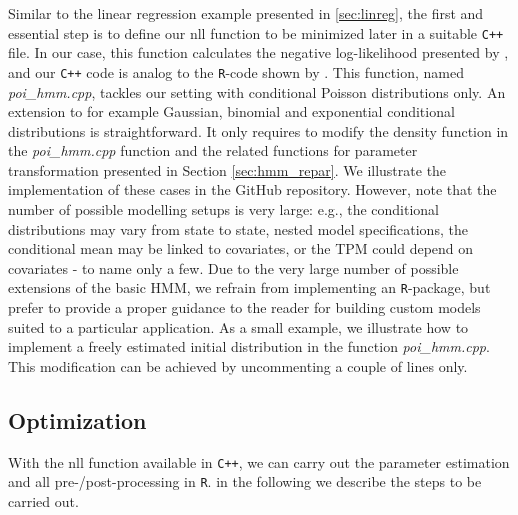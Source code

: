 \documentclass[bimj,fleqn]{w-art}\usepackage[]{graphicx}\usepackage[]{color}
\theoremstyle{plain}
\theoremstyle{definition}
\begin{document}
Similar to the linear regression example presented in \ref{sec:linreg}, the first and essential step is to define our nll function to be minimized later in a suitable {\tt{C++}} file. In our case, this function calculates the negative log-likelihood presented by \citet[p. ~48]{zucchini}, and our {\tt{C++}} code is analog to the {\tt{R}}-code shown by \citet[p. ~331 - 333]{zucchini}. This function, named \textit{poi\_hmm.cpp}, tackles our setting with conditional Poisson distributions only. An extension to for example Gaussian, binomial and exponential conditional distributions is straightforward. It only requires to modify the density function in the \textit{poi\_hmm.cpp} function and the related functions for parameter transformation presented in Section \ref{sec:hmm_repar}. We illustrate the implementation of these cases in the GitHub repository. However, note that the number of possible modelling setups is very large: e.g., the conditional distributions may vary from state to state, nested model specifications, the conditional mean may be linked to covariates, or the TPM could depend on covariates - to name only a few. Due to the very large number of possible extensions of the basic HMM, we refrain from implementing an {\tt{R}}-package, but prefer to provide a proper guidance to the reader for building custom models suited to a particular application. As a small example, we illustrate how to implement a freely estimated initial distribution in the function \textit{poi\_hmm.cpp}. This modification can be achieved by uncommenting a couple of lines only.  

\subsection{Optimization}
\label{sec:tmb_r}

With the nll function available in {\tt{C++}}, we can carry out the parameter estimation and all pre-/post-processing in {\tt{R}}. in the following we describe the steps to be carried out.
\end{document}
